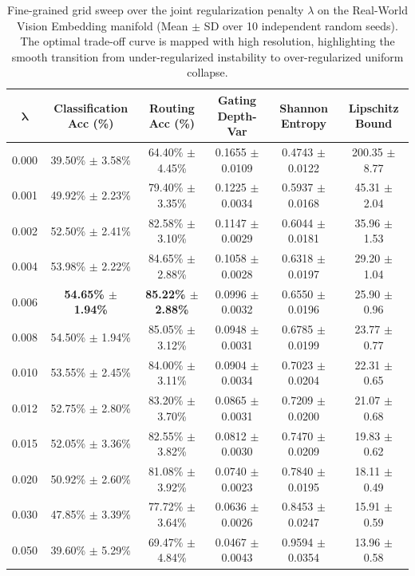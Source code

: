 \begin{table}[t]
\centering
\small
\caption{Fine-grained grid sweep over the joint regularization penalty $\lambda$ on the Real-World Vision Embedding manifold (Mean $\pm$ SD over 10 independent random seeds). The optimal trade-off curve is mapped with high resolution, highlighting the smooth transition from under-regularized instability to over-regularized uniform collapse.}
\vskip 0.15in
\label{tab:fine_grained_sweep}
\begin{tabular*}{\textwidth}{@{\extracolsep{\fill}}cccccc}
\toprule
$\boldsymbol{\lambda}$ & \textbf{Classification Acc (\%)} & \textbf{Routing Acc (\%)} & \textbf{Gating Depth-Var} & \textbf{Shannon Entropy} & \textbf{Lipschitz Bound} \\
\midrule
0.000 & 39.50\% $\pm$ 3.58\% & 64.40\% $\pm$ 4.45\% & 0.1655 $\pm$ 0.0109 & 0.4743 $\pm$ 0.0122 & 200.35 $\pm$ 8.77 \\
0.001 & 49.92\% $\pm$ 2.23\% & 79.40\% $\pm$ 3.35\% & 0.1225 $\pm$ 0.0034 & 0.5937 $\pm$ 0.0168 & 45.31 $\pm$ 2.04 \\
0.002 & 52.50\% $\pm$ 2.41\% & 82.58\% $\pm$ 3.10\% & 0.1147 $\pm$ 0.0029 & 0.6044 $\pm$ 0.0181 & 35.96 $\pm$ 1.53 \\
0.004 & 53.98\% $\pm$ 2.22\% & 84.65\% $\pm$ 2.88\% & 0.1058 $\pm$ 0.0028 & 0.6318 $\pm$ 0.0197 & 29.20 $\pm$ 1.04 \\
0.006 & \textbf{54.65\% $\pm$ 1.94\%} & \textbf{85.22\% $\pm$ 2.88\%} & 0.0996 $\pm$ 0.0032 & 0.6550 $\pm$ 0.0196 & 25.90 $\pm$ 0.96 \\
0.008 & 54.50\% $\pm$ 1.94\% & 85.05\% $\pm$ 3.12\% & 0.0948 $\pm$ 0.0031 & 0.6785 $\pm$ 0.0199 & 23.77 $\pm$ 0.77 \\
0.010 & 53.55\% $\pm$ 2.45\% & 84.00\% $\pm$ 3.11\% & 0.0904 $\pm$ 0.0034 & 0.7023 $\pm$ 0.0204 & 22.31 $\pm$ 0.65 \\
0.012 & 52.75\% $\pm$ 2.80\% & 83.20\% $\pm$ 3.70\% & 0.0865 $\pm$ 0.0031 & 0.7209 $\pm$ 0.0200 & 21.07 $\pm$ 0.68 \\
0.015 & 52.05\% $\pm$ 3.36\% & 82.55\% $\pm$ 3.82\% & 0.0812 $\pm$ 0.0030 & 0.7470 $\pm$ 0.0209 & 19.83 $\pm$ 0.62 \\
0.020 & 50.92\% $\pm$ 2.60\% & 81.08\% $\pm$ 3.92\% & 0.0740 $\pm$ 0.0023 & 0.7840 $\pm$ 0.0195 & 18.11 $\pm$ 0.49 \\
0.030 & 47.85\% $\pm$ 3.39\% & 77.72\% $\pm$ 3.64\% & 0.0636 $\pm$ 0.0026 & 0.8453 $\pm$ 0.0247 & 15.91 $\pm$ 0.59 \\
0.050 & 39.60\% $\pm$ 5.29\% & 69.47\% $\pm$ 4.84\% & 0.0467 $\pm$ 0.0043 & 0.9594 $\pm$ 0.0354 & 13.96 $\pm$ 0.58 \\
\bottomrule
\end{tabular*}
\end{table}

